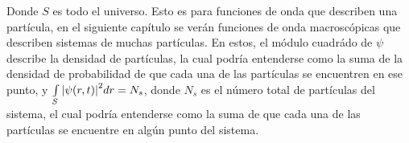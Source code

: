 Donde $S$ es todo el universo. Esto es para funciones de onda que describen una partícula, en el siguiente capítulo se verán funciones de onda macroscópicas que describen sistemas de muchas partículas. En estos, el módulo cuadrádo de $\psi$ describe la densidad de partículas, la cual podría entenderse como la suma de la densidad de probabilidad de que cada una de las partículas se encuentren en ese punto, y $\int\limits_S \abs{\psi(r,t)}^2 dr = N_s$, donde $N_s$ es el número total de partículas del sistema, el cual podría entenderse como la suma de que cada una de las partículas se encuentre en algún punto del sistema.



